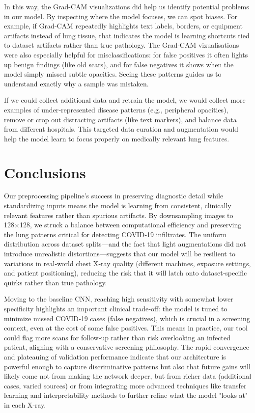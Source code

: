 \documentclass[conference]{IEEEtran}
\begin{document}
In this way, the Grad-CAM visualizations did help us identify potential problems in our model. By inspecting where the model focuses, we can spot biases. For example, if Grad‑CAM repeatedly highlights text labels, borders, or equipment artifacts instead of lung tissue, that indicates the model is learning shortcuts tied to dataset artifacts rather than true pathology. The Grad‑CAM vizualisations were also especially helpful for misclassifications: for false positives it often lights up benign findings (like old scars), and for false negatives it shows when the model simply missed subtle opacities. Seeing these patterns guides us to understand exactly why a sample was mistaken.

If we could collect additional data and retrain the model, we would collect more examples of under‑represented disease patterns (e.g., peripheral opacities), remove or crop out distracting artifacts (like text markers), and balance data from different hospitals. This targeted data curation and augmentation would help the model learn to focus properly on medically relevant lung features.

\section{Conclusions}\label{sec:conclusions}
Our preprocessing pipeline’s success in preserving diagnostic detail while standardizing inputs means the model is learning from consistent, clinically relevant features rather than spurious artifacts. By downsampling images to 128×128, we struck a balance between computational efficiency and preserving the lung patterns critical for detecting COVID‑19 infiltrates. The uniform distribution across dataset splits—and the fact that light augmentations did not introduce unrealistic distortions—suggests that our model will be resilient to variations in real‑world chest X‑ray quality (different machines, exposure settings, and patient positioning), reducing the risk that it will latch onto dataset‐specific quirks rather than true pathology.

Moving to the baseline CNN, reaching high sensitivity with somewhat lower specificity highlights an important clinical trade‑off: the model is tuned to minimize missed COVID‑19 cases (false negatives), which is crucial in a screening context, even at the cost of some false positives. This means in practice, our tool could flag more scans for follow‑up rather than risk overlooking an infected patient, aligning with a conservative screening philosophy. The rapid convergence and plateauing of validation performance indicate that our architecture is powerful enough to capture discriminative patterns but also that future gains will likely come not from making the network deeper, but from richer data (additional cases, varied sources) or from integrating more advanced techniques like transfer learning and interpretability methods to further refine what the model "looks at" in each X‑ray.
\end{document}
